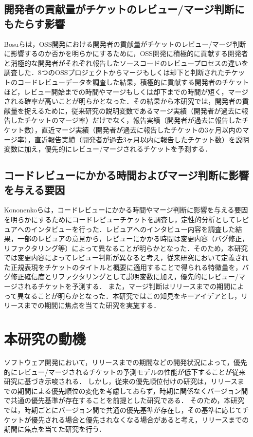 \documentclass[11pt]{jreport}
\begin{document}
\subsection{開発者の貢献量がチケットのレビュー/マージ判断にもたらす影響}
Bosu\cite{review1}らは，OSS開発における開発者の貢献量がチケットのレビュー/マージ判断に影響するのか否かを明らかにするために，OSS開発に積極的に貢献する開発者と消極的な開発者がそれぞれ報告したソースコードのレビュープロセスの違いを調査した．8つのOSSプロジェクトからマージもしくは却下と判断されたチケットのコードレビューデータを調査した結果，積極的に貢献する開発者のチケットほど，レビュー開始までの時間やマージもしくは却下までの時間が短く，マージされる確率が高いことが明らかとなった．その結果から本研究では，開発者の貢献量を捉えるために，従来研究\cite{prioritizer}の説明変数であるマージ実績（開発者が過去に報告したチケットのマージ率）だけでなく，報告実績（開発者が過去に報告したチケット数），直近マージ実績（開発者が過去に報告したチケットの3ヶ月以内のマージ率），直近報告実績（開発者が過去3ヶ月以内に報告したチケット数）を説明変数に加え，優先的にレビュー/マージされるチケットを予測する．

\subsection{コードレビューにかかる時間およびマージ判断に影響を与える要因}
Kononenko\cite{release_merge}らは，コードレビューにかかる時間やマージ判断に影響を与える要因を明らかにするためにコードレビューチケットを調査し，定性的分析としてレビュアへのインタビューを行った．レビュアへのインタビュー内容を調査した結果，一部のレビュアの意見から，レビューにかかる時間は変更内容（バグ修正，リファクタリング等）によって異なることが明らかとなった．そのため，本研究では変更内容によってレビュー判断が異なると考え，従来研究\cite{bug}\cite{refactoring}において定義された正規表現をチケットのタイトルと概要に適用することで得られる特徴量を，バグ修正確信度とリファクタリングとして説明変数に加え，優先的にレビュー/マージされるチケットを予測する．
また，マージ判断はリリースまでの期間によって異なることが明らかとなった．本研究ではこの知見をキーアイデアとし，リリースまでの期間に焦点を当てた研究を実施する．

\section{本研究の動機}
ソフトウェア開発において，リリースまでの期間などの開発状況によって，優先的にレビュー/マージされるチケットの予測モデルの性能が低下することが従来研究\cite{release_merge}に基づき示唆される．
しかし，従来の優先順位付けの研究\cite{prioritizer}\cite{review_prioritize_pineapple}\cite{prioritize_azeem}\cite{prioritize_fan}は，リリースまでの期間による優先順位の変化を考慮しておらず，時期に関係なくバージョン間で共通の優先基準が存在することを前提とした研究である．
そのため，本研究では，時期ごとにバージョン間で共通の優先基準が存在し，その基準に応じてチケットが優先される場合と優先されなくなる場合があると考え，リリースまでの期間に焦点を当てた研究を行う．
\end{document}
